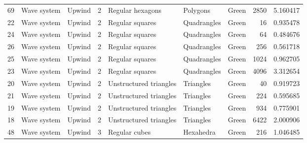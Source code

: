 \begin{tabular}{lllrlllrr}
69 &  Wave system &                            Upwind &               2 &                Regular hexagons &              Polygons  &      Green &                     2850 &                         5.160417 \\
22 &  Wave system &                            Upwind &               2 &                 Regular squares &           Quadrangles  &      Green &                       16 &                         0.935478 \\
24 &  Wave system &                            Upwind &               2 &                 Regular squares &           Quadrangles  &      Green &                       64 &                         0.484676 \\
26 &  Wave system &                            Upwind &               2 &                 Regular squares &           Quadrangles  &      Green &                      256 &                         0.561718 \\
25 &  Wave system &                            Upwind &               2 &                 Regular squares &           Quadrangles  &      Green &                     1024 &                         0.962705 \\
23 &  Wave system &                            Upwind &               2 &                 Regular squares &           Quadrangles  &      Green &                     4096 &                         3.312654 \\
20 &  Wave system &                            Upwind &               2 &          Unstructured triangles &             Triangles  &      Green &                       40 &                         0.919723 \\
21 &  Wave system &                            Upwind &               2 &          Unstructured triangles &             Triangles  &      Green &                      224 &                         0.595685 \\
19 &  Wave system &                            Upwind &               2 &          Unstructured triangles &             Triangles  &      Green &                      934 &                         0.775901 \\
18 &  Wave system &                            Upwind &               2 &          Unstructured triangles &             Triangles  &      Green &                     6422 &                         2.000906 \\
48 &  Wave system &                            Upwind &               3 &                   Regular cubes &             Hexahedra  &      Green &                      216 &                         1.046485 \\

\end{tabular}
